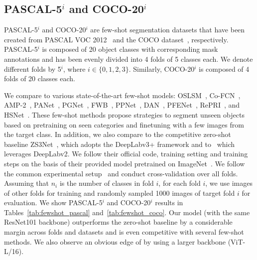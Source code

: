 \subsection{PASCAL-5$^i$ and COCO-20$^i$}
PASCAL-5$^i$ and COCO-20$^i$ are few-shot segmentation datasets that have been created from PASCAL VOC 2012~\citep{Everingham15} and the COCO dataset~\citep{lin2014microsoft}, respectively. PASCAL-5$^i$ is composed of 20 object classes with corresponding mask annotations and has been evenly divided into 4 folds of 5 classes each. We denote different folds by 5$^i$, where $i \in \{0, 1, 2, 3\}$. Similarly, COCO-20$^i$ is composed of 4 folds of 20 classes each. 


 We compare \methodname{} to various state-of-the-art few-shot models: OSLSM~\citep{shaban2017one}, Co-FCN~\citep{rakelly2018conditional}, AMP-2~\citep{siam2019amp}, PANet~\citep{wang2019panet}, PGNet~\citep{zhang2019pyramid}, FWB~\citep{nguyen2019feature}, PPNet~\citep{liu2020part}, DAN~\citep{wang2020few}, PFENet~\citep{tian2020prior}, RePRI~\citep{boudiaf2021few}, and HSNet~\citep{min2021hypercorrelation}. These few-shot methods propose strategies to segment unseen objects based on pretraining on seen categories and finetuning with a few images from the  target class.
 In addition, we also compare to the competitive zero-shot baseline ZS3Net~\citep{bucher2019zero}, which adopts the DeepLabv3+ framework and to~\citet{xian2019semantic} which leverages DeepLabv2. We follow their official code, training setting and training steps on the basis of their provided model pretrained on ImageNet~\citep{deng2009imagenet}. We follow the common experimental setup~\citep{nguyen2019feature} 
 and conduct cross-validation over all folds. Assuming that $n_i$ is the number of classes in fold $i$, for each fold $i$, we use images of other folds for training and randomly sampled 1000 images of target fold $i$ for evaluation. We show PASCAL-5$^i$ and COCO-20$^i$ results in Tables~\ref{tab:fewshot_pascal} and~\ref{tab:fewshot_coco}. Our model (with the same ResNet101 backbone) outperforms the zero-shot baseline by a considerable margin across folds and datasets and is even competitive with several few-shot methods. We also observe an obvious edge of \methodname{} by using a larger backbone (ViT-L/16).
 \begin{table} %
    \centering
    
    \label{tab:fewshot_fss}
\end{table}

